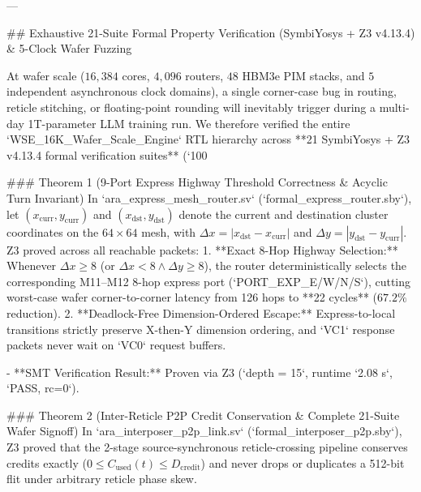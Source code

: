 \documentclass[journal,10pt,twocolumn]{IEEEtran}
\begin{document}
---

## Exhaustive 21-Suite Formal Property Verification (SymbiYosys + Z3 v4.13.4) & 5-Clock Wafer Fuzzing

At wafer scale ($16,384$ cores, $4,096$ routers, $48$ HBM3e PIM stacks, and $5$ independent asynchronous clock domains), a single corner-case bug in routing, reticle stitching, or floating-point rounding will inevitably trigger during a multi-day 1T-parameter LLM training run. We therefore verified the entire `WSE_16K_Wafer_Scale_Engine` RTL hierarchy across **21 SymbiYosys + Z3 v4.13.4 formal verification suites** (`100%

### Theorem 1 (9-Port Express Highway Threshold Correctness & Acyclic Turn Invariant)
In `ara_express_mesh_router.sv` (`formal_express_router.sby`), let $(x_{\mathrm{curr}}, y_{\mathrm{curr}})$ and $(x_{\mathrm{dst}}, y_{\mathrm{dst}})$ denote the current and destination cluster coordinates on the $64 \times 64$ mesh, with $\Delta x = |x_{\mathrm{dst}} - x_{\mathrm{curr}}|$ and $\Delta y = |y_{\mathrm{dst}} - y_{\mathrm{curr}}|$. Z3 proved across all reachable packets:
1. **Exact 8-Hop Highway Selection:** Whenever $\Delta x \ge 8$ (or $\Delta x < 8 \wedge \Delta y \ge 8$), the router deterministically selects the corresponding M11–M12 8-hop express port (`PORT_EXP_E/W/N/S`), cutting worst-case wafer corner-to-corner latency from 126 hops to **22 cycles** ($67.2\%$ reduction).
2. **Deadlock-Free Dimension-Ordered Escape:** Express-to-local transitions strictly preserve X-then-Y dimension ordering, and `VC1` response packets never wait on `VC0` request buffers.

- **SMT Verification Result:** Proven via Z3 (`depth = 15`, runtime `2.08 s`, `PASS, rc=0`).

### Theorem 2 (Inter-Reticle P2P Credit Conservation & Complete 21-Suite Wafer Signoff)
In `ara_interposer_p2p_link.sv` (`formal_interposer_p2p.sby`), Z3 proved that the 2-stage source-synchronous reticle-crossing pipeline conserves credits exactly ($0 \le C_{\mathrm{used}}(t) \le D_{\mathrm{credit}}$) and never drops or duplicates a 512-bit flit under arbitrary reticle phase skew.
\end{document}
